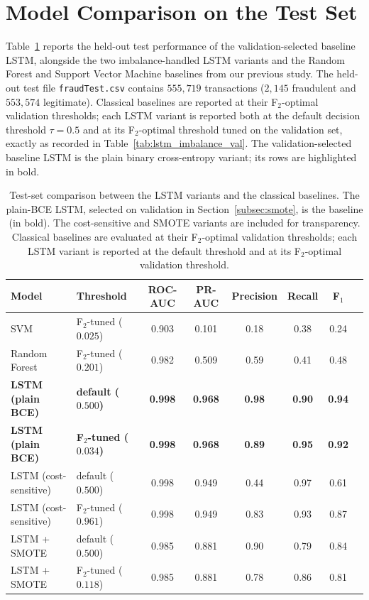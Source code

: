 \documentclass[oneside,12pt,parskip=half,american,numbers=noenddot]{scrreprt}
\begin{document}
\section{Model Comparison on the Test Set}
\label{subsec:model_comparison}

Table~\ref{tab:lstm_vs_classic} reports the held-out test performance of the validation-selected baseline LSTM, alongside the two imbalance-handled LSTM variants and the Random Forest and Support Vector Machine baselines from our previous study. The held-out test file \texttt{fraudTest.csv} contains $555{,}719$ transactions ($2{,}145$ fraudulent and $553{,}574$ legitimate). Classical baselines are reported at their F$_2$-optimal validation thresholds; each LSTM variant is reported both at the default decision threshold $\tau = 0.5$ and at its F$_2$-optimal threshold tuned on the validation set, exactly as recorded in Table~\ref{tab:lstm_imbalance_val}. The validation-selected baseline LSTM is the plain binary cross-entropy variant; its rows are highlighted in bold.

\begin{table}[H]
\centering
\caption{Test-set comparison between the LSTM variants and the classical baselines. The plain-BCE LSTM, selected on validation in Section~\ref{subsec:smote}, is the baseline (in bold). The cost-sensitive and SMOTE variants are included for transparency. Classical baselines are evaluated at their F$_2$-optimal validation thresholds; each LSTM variant is reported at the default threshold and at its F$_2$-optimal validation threshold.}
\label{tab:lstm_vs_classic}
\small
\renewcommand{\arraystretch}{1.2}
\begin{tabular}{llcccccc}
\hline
\textbf{Model} & \textbf{Threshold} & \textbf{ROC-AUC} & \textbf{PR-AUC} & \textbf{Precision} & \textbf{Recall} & \textbf{F$_1$} \\
\hline
SVM           & F$_2$-tuned ($0.025$)    & 0.903 & 0.101 & 0.18 & 0.38 & 0.24 \\
Random Forest & F$_2$-tuned ($0.201$)    & 0.982 & 0.509 & 0.59 & 0.41 & 0.48 \\
\hline
\textbf{LSTM (plain BCE)} & \textbf{default ($0.500$)}    & \textbf{0.998} & \textbf{0.968} & \textbf{0.98} & \textbf{0.90} & \textbf{0.94} \\
\textbf{LSTM (plain BCE)} & \textbf{F$_2$-tuned ($0.034$)} & \textbf{0.998} & \textbf{0.968} & \textbf{0.89} & \textbf{0.95} & \textbf{0.92} \\
\hline
LSTM (cost-sensitive) & default ($0.500$)        & 0.998 & 0.949 & 0.44 & 0.97 & 0.61 \\
LSTM (cost-sensitive) & F$_2$-tuned ($0.961$)    & 0.998 & 0.949 & 0.83 & 0.93 & 0.87 \\
\hline
LSTM + SMOTE          & default ($0.500$)        & 0.985 & 0.881 & 0.90 & 0.79 & 0.84 \\
LSTM + SMOTE          & F$_2$-tuned ($0.118$)    & 0.985 & 0.881 & 0.78 & 0.86 & 0.81 \\
\hline
\end{tabular}
\end{table}
\end{document}

